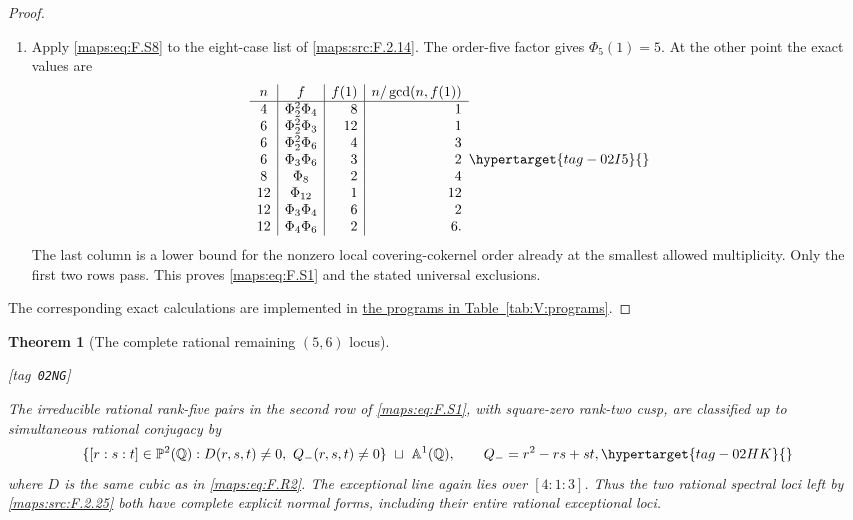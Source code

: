 \documentclass[11pt,a4paper]{article}
\numberwithin{equation}{section}
\newtheorem{theorem}{Theorem}[section]
\theoremstyle{definition}
\newcommand{\StatementRecord}[4]{{\upshape\footnotesize[tag~\texttt{#3}]}\enspace\ignorespaces}
\begin{document}
\begin{proof}
\begin{enumerate}[label=\arabic*.]
\item Apply \eqref{maps:eq:F.S8} to the eight-case
list of \ref{maps:src:F.2.14}.  The order-five factor gives $\Phi_5(1)=5$.
At the other point the exact values are
\begin{equation}
\begin{array}{c|c|r|r}
 n&f&f(1)&n/\gcd(n,f(1))\\\hline
 4&\Phi_2^2\Phi_4&8&1\\
 6&\Phi_2^2\Phi_3&12&1\\
 6&\Phi_2^2\Phi_6&4&3\\
 6&\Phi_3\Phi_6&3&2\\
 8&\Phi_8&2&4\\
 12&\Phi_{12}&1&12\\
 12&\Phi_3\Phi_4&6&2\\
 12&\Phi_4\Phi_6&2&6.
\end{array}
 \hypertarget{tag-02I5}{}\label{maps:eq:F.S9}
\end{equation}
The last column is a lower bound for the nonzero local
covering-cokernel order already at the smallest allowed
multiplicity.  Only the first two rows pass.
This proves \eqref{maps:eq:F.S1} and the stated universal exclusions.

\end{enumerate}
The corresponding exact calculations are implemented in \hyperlink{prog:V:suspension}{the programs in Table~\ref*{tab:V:programs}}.
\end{proof}




\begin{theorem}[The complete rational remaining $(5,6)$ locus]\hypertarget{tag-02NG}{}\label{maps:src:F.2.26}
\StatementRecord{maps:src:F.2.26}{proved}{02NG}{\eqref{maps:eq:F.S1}, \eqref{maps:eq:F.R2}, \cref{maps:src:F.2.25}, \eqref{maps:eq:F.R3}, \eqref{maps:eq:F.R5}, \cref{maps:src:F.2.20}, \eqref{maps:eq:F.R6}, \eqref{maps:eq:F.R7}, \eqref{maps:eq:F.R8}, \eqref{maps:eq:F.R12}, \cref{maps:src:F.2.22}}


The irreducible rational rank-five pairs in the second row
of \eqref{maps:eq:F.S1}, with square-zero rank-two cusp, are classified
up to simultaneous rational conjugacy by
\begin{equation}
 \{[r:s:t]\in\mathbb P^2(\mathbb Q):
             D(r,s,t)\ne0,\ Q_-(r,s,t)\ne0\}
       \ \sqcup\ \mathbb A^1(\mathbb Q),
 \qquad Q_-=r^2-rs+st,
 \hypertarget{tag-02HK}{}\label{maps:eq:F.R10}
\end{equation}
where $D$ is the same cubic as in \eqref{maps:eq:F.R2}.
The exceptional line again lies over $[4:1:3]$.
Thus the two rational spectral loci left by \ref{maps:src:F.2.25} both
have complete explicit normal forms, including their
entire rational exceptional loci.

\end{theorem}
\end{document}
